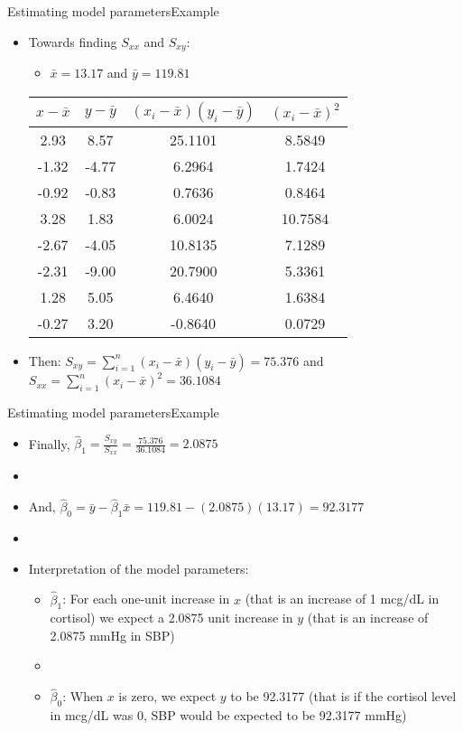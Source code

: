 \documentclass[xcolor=dvipsnames]{beamer}
\begin{document}
\begin{frame}{Estimating model parameters}{Example}
\begin{itemize}
	\item Towards finding $S_{xx}$ and $S_{xy}$:
	\begin{itemize}
		\item $\bar{x} = 13.17$ and $\bar{y} = 119.81$
	\end{itemize}
	\vspace{1mm}
	\begin{center}
		\begin{tabular}{cccc}
			\hline
		 $x-\bar{x}$ & $y-\bar{y}$ & $(x_i - \bar{x})(y_i - \bar{y})$ & $\left(x_i - \bar{x}\right)^2$ \\ 
			\hline
			 2.93 &  8.57& 25.1101 & 8.5849\\ 
			 -1.32 &  -4.77 & 6.2964 & 1.7424\\ 
			 -0.92 & -0.83 & 0.7636 & 0.8464 \\ 
			 3.28 &  1.83 & 6.0024 & 10.7584\\ 
			 -2.67 &  -4.05 & 10.8135 & 7.1289\\ 
			 -2.31 &  -9.00 & 20.7900 & 5.3361\\ 
			 1.28 &  5.05 & 6.4640 & 1.6384\\ 
			 -0.27 &  3.20 & -0.8640 & 0.0729\\ 
			\hline
		\end{tabular}
	\end{center}
		\vspace{1mm}
		\item Then: $S_{xy} = \sum_{i=1}^{n}(x_i - \bar{x})(y_i - \bar{y}) = 75.376$ and $S_{xx} = \sum_{i=1}^{n}\left(x_i - \bar{x}\right)^2 = 36.1084$
\end{itemize}
\end{frame}

\begin{frame}{Estimating model parameters}{Example}
	\begin{itemize}
		\item Finally, $\hat{\beta}_1 = \frac{S_{xy}}{S_{xx}} =  \frac{75.376}{36.1084}  = 2.0875$ \pause
		\item[]
		\item And, $\hat{\beta}_0 = \bar{y} - \hat{\beta}_1 \bar{x} = 119.81 - (2.0875)(13.17) = 92.3177 $ \pause
		\item[]
		\item Interpretation of the model parameters: \pause
		\begin{itemize}
			\item $\hat{\beta}_1$: For each one-unit increase in $x$ (that is an increase of 1 mcg/dL in cortisol) we expect a 2.0875 unit increase in $y$ (that is an increase of 2.0875 mmHg in SBP) \pause
			\item[]
			\item $\hat{\beta}_0$: When $x$ is zero, we expect $y$ to be 92.3177 (that is if the cortisol level in mcg/dL was 0, SBP would be expected to be 92.3177 mmHg)
		\end{itemize}
	\end{itemize}
\end{frame}
\end{document}

